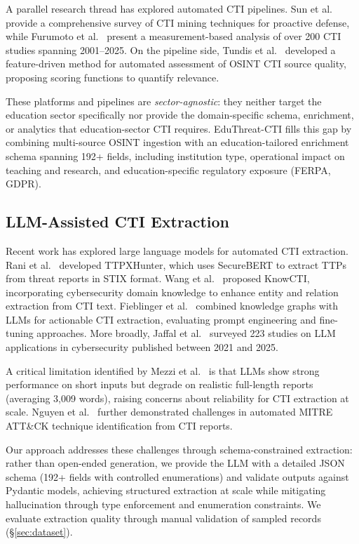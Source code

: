 \documentclass[sigconf,anonymous]{acmart}
\newcommand{\sys}{EduThreat-CTI\xspace}
\begin{document}
A parallel research thread has explored automated CTI pipelines. Sun et al.~\cite{sun2023ctisurvey} provide a comprehensive survey of CTI mining techniques for proactive defense, while Furumoto et al.~\cite{furumoto2025ctisurvey} present a measurement-based analysis of over 200 CTI studies spanning 2001--2025. On the pipeline side, Tundis et al.~\cite{tundis2022feature} developed a feature-driven method for automated assessment of OSINT CTI source quality, proposing scoring functions to quantify relevance.

These platforms and pipelines are \textit{sector-agnostic}: they neither target the education sector specifically nor provide the domain-specific schema, enrichment, or analytics that education-sector CTI requires. \sys fills this gap by combining multi-source OSINT ingestion with an education-tailored enrichment schema spanning 192+ fields, including institution type, operational impact on teaching and research, and education-specific regulatory exposure (FERPA, GDPR).

\subsection{LLM-Assisted CTI Extraction}\label{sec:related:llm}

Recent work has explored large language models for automated CTI extraction. Rani et al.~\cite{rani2024ttpxhunter} developed TTPXHunter, which uses SecureBERT to extract TTPs from threat reports in STIX format. Wang et al.~\cite{wang2024knowcti} proposed KnowCTI, incorporating cybersecurity domain knowledge to enhance entity and relation extraction from CTI text. Fieblinger et al.~\cite{fieblinger2024kgllmcti} combined knowledge graphs with LLMs for actionable CTI extraction, evaluating prompt engineering and fine-tuning approaches. More broadly, Jaffal et al.~\cite{jaffal2025llmcybersec} surveyed 223 studies on LLM applications in cybersecurity published between 2021 and 2025.

A critical limitation identified by Mezzi et al.~\cite{mezzi2025unreliable} is that LLMs show strong performance on short inputs but degrade on realistic full-length reports (averaging 3{,}009 words), raising concerns about reliability for CTI extraction at scale. Nguyen et al.~\cite{nguyen2025mitreextract} further demonstrated challenges in automated MITRE ATT\&CK technique identification from CTI reports.

Our approach addresses these challenges through schema-constrained extraction: rather than open-ended generation, we provide the LLM with a detailed JSON schema (192+ fields with controlled enumerations) and validate outputs against Pydantic models, achieving structured extraction at scale while mitigating hallucination through type enforcement and enumeration constraints. We evaluate extraction quality through manual validation of sampled records (\S\ref{sec:dataset}).
\end{document}
